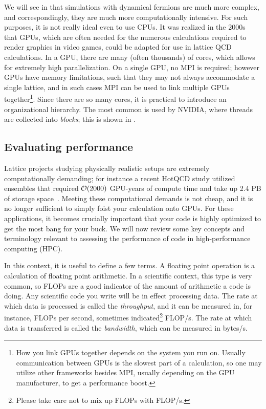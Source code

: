 We will see in  that simulations with dynamical fermions
are much more complex, and correspondingly, they are much more
computationally intensive. For such purposes, it is not really ideal even
to use CPUs. It was realized in the 2000s~\cite{egri_lattice_2007}
that GPUs, which
are often needed for the numerous calculations required to render graphics
in video games, could be adapted for use in lattice QCD calculations.
In a GPU, there are many (often thousands) of cores, which allows for
extremely high parallelization. On a single GPU, no MPI is required;
however GPUs have memory limitations, such that they may not always accommodate
a single lattice, and in such cases MPI can be used to link
multiple GPUs together\footnote{How you link GPUs together depends on the
system you run on. Usually communication between GPUs is the slowest part
of a calculation, so one may utilize other frameworks besides MPI, usually
depending on the GPU manufacturer, to get a performance boost.}.
Since there are so many cores, it is practical to introduce an organizational
hierarchy. The most common is used by NVIDIA, where threads are collected
into {\it blocks}; this is shown in .

\subsection{Evaluating performance}

Lattice projects studying physically realistic setups
 are extremely computationally demanding; for instance
a recent HotQCD study utilized ensembles that required
$\order{2000}$ GPU-years of compute time and take up 2.4 PB of storage 
space~\cite{Bollweg:2021vqf}. Meeting these computational demands is
not cheap, and it is no longer sufficient to simply foist your
calculation onto GPUs. For these applications, it becomes crucially 
important that your code is highly
optimized to get the most bang for your buck.
We will now review some key concepts and terminology
relevant to assessing the performance of code
in high-performance computing (HPC). 

In this context, it is useful to define a few terms. A floating
point operation is a calculation of floating point arithmetic. In a
scientific context, this type is very common, so FLOPs are a good indicator
of the amount of arithmetic a code is doing. Any scientific code you write will
be in effect processing data. The rate at which data is processed
is called the {\it throughput}, 
and it can be measured in, for instance, FLOPs
per second, sometimes indicated\footnote{Please take care not to
mix up FLOPs with FLOP/s.} FLOP/s. The rate at which data is
transferred is called the {\it bandwidth},
which can be measured in bytes/s.

